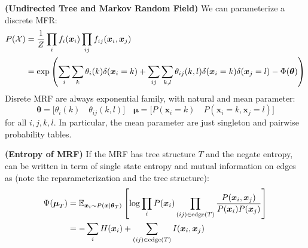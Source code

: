 \begin{remark}{\textbf{(Undirected Tree and Markov Random Field)}}
    We can parameterize a discrete MFR:
    \begin{equation*}
    \begin{aligned}
        P(\mathcal{X}) &= \frac{1}{Z}\prod_if_i(\boldsymbol x_i)\prod_{ij}f_{ij}(\boldsymbol x_i, \boldsymbol x_j) \\
        &= \exp\left(  \sum_i\sum_k\theta_i(k)\delta(\boldsymbol x_i = k) + \sum_{ij}\sum_{k,l}\theta_{ij}(k,l)\delta(\boldsymbol x_i = k)\delta(\boldsymbol x_j = l) - \Phi(\boldsymbol \theta)  \right)
    \end{aligned}
    \end{equation*}
    Disrete MRF are always exponential family, with natural and mean parameter:
    \begin{equation*}
        \boldsymbol \theta = \Big[\theta_i(k) \quad \theta_{ij}(k, l)\Big] \quad \boldsymbol \mu = \Big[ P(\boldsymbol x_i = k) \quad P(\boldsymbol x_i = k, \boldsymbol x_j = l) \Big]
    \end{equation*}
    for all $i,j,k,l$. In particular, the mean parameter are just singleton and pairwise probability tables. 
\end{remark}

\begin{remark}{\textbf{(Entropy of MRF)}}
    If the MRF has tree structure $T$ and the negate entropy, can be written in term of single state entropy and mutual information on edges as (note the reparameterization and the tree structure):
    \begin{equation*}
    \begin{aligned}
        \Psi(\boldsymbol \mu_T) &= \mathbb{E}_{\boldsymbol x_i \sim P(\boldsymbol x | \boldsymbol \theta_T)}\left[  \log \prod_i P(\boldsymbol x_i)\prod_{(ij) \in \operatorname{edge}(T)} \frac{P(\boldsymbol x_i, \boldsymbol x_j)}{P(\boldsymbol x_i)P(\boldsymbol x_j)}  \right] \\
        &= -\sum_iH(\boldsymbol x_i) +\sum_{(ij)\in\operatorname{edge}(T)}I(\boldsymbol x_i, \boldsymbol x_j)
    \end{aligned}
    \end{equation*}
\end{remark}

